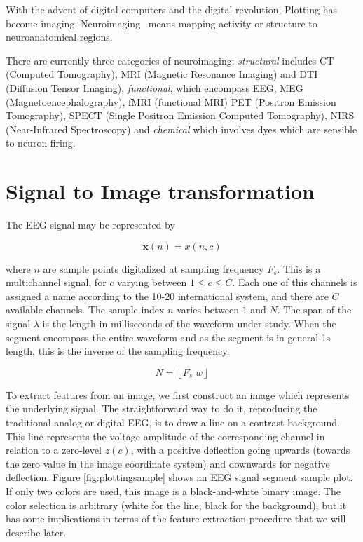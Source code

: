 \begin{story}[Neuroimaging]
With the advent of digital computers and the digital revolution, Plotting has become imaging.  Neuroimaging~\cite{Freeman2013} means mapping activity or structure to neuroanatomical regions.

There are currently three categories of neuroimaging: \textit{structural} includes CT (Computed Tomography), MRI (Magnetic Resonance Imaging) and DTI (Diffusion Tensor Imaging), \textit{functional}, which encompass EEG, MEG (Magnetoencephalography), fMRI (functional MRI) PET (Positron Emission Tomography), SPECT (Single Positron Emission Computed Tomography), NIRS (Near-Infrared Spectroscopy) and \textit{chemical} which involves dyes which are sensible to neuron firing.
\end{story}

\section{Signal to Image transformation}

The EEG signal may be represented by

\begin{equation}
\mathbf{x}(n) = x(n,c)
\label{eq:zerolevel}
\end{equation}

\noindent where $n$ are sample points digitalized at sampling frequency $F_s$.  This is a multichannel signal, for $c$ varying between  $1 \leq c \leq C$.  Each one of this channels is assigned a name according to the 10-20 international system, and there are $C$ available channels. The sample index $n$ varies between $1$ and $N$.  The span of the signal $\lambda$ is the length in milliseconds of the waveform under study. When the segment encompass the entire waveform and as the segment is in general 1s length, this is the inverse of the sampling frequency.

\begin{equation}
N = \left\lfloor F_s \; w \right\rfloor
\label{eq:segmentlength}
\end{equation}

\vspace{3pt}

To extract features from an image, we first construct an image which represents the underlying signal.  The straightforward way to do it, reproducing the traditional analog or digital EEG, is to draw a line on a contrast background.  This line represents the voltage amplitude of the corresponding channel in relation to a zero-level $z(c)$, with a positive deflection going upwards (towards the zero value in the image coordinate system) and downwards for negative deflection.  Figure \ref{fig:plottingsample} shows an EEG signal segment sample plot.  If only two colors are used, this image is a black-and-white binary image.  The color selection is arbitrary (white for the line, black for the background), but it has some implications in terms of the feature extraction procedure that we will describe later.

